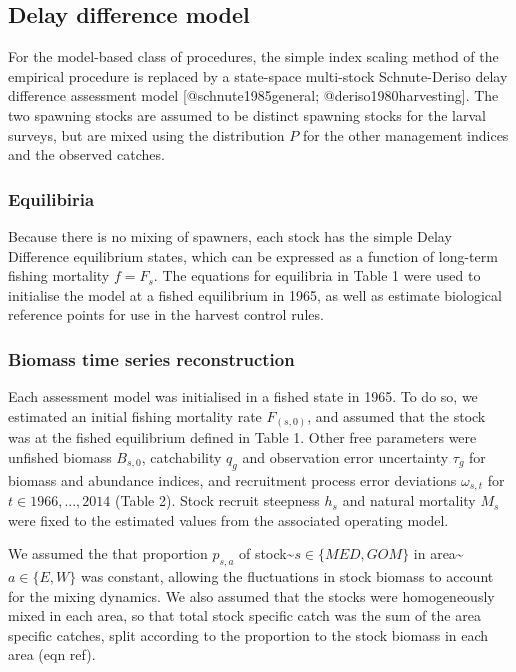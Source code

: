 \documentclass[]{article}
\begin{document}
\hypertarget{delay-difference-model}{%
\subsection{Delay difference model}\label{delay-difference-model}}

For the model-based class of procedures, the simple index scaling
method of the empirical procedure is replaced by a state-space
multi-stock Schnute-Deriso delay difference assessment model
{[}@schnute1985general; @deriso1980harvesting{]}. The two spawning
stocks are assumed to be distinct spawning stocks for the larval
surveys, but are mixed using the distribution \(P\) for
the other management indices and the observed catches.

\hypertarget{equilibiria}{%
\subsubsection{Equilibiria}\label{equilibiria}}

Because there is no mixing of spawners, each stock has the simple Delay
Difference equilibrium states, which can be expressed as a function
of long-term fishing mortality \(f = F_s\). The equations for equilibria
in Table 1 were used to initialise the model at a fished equilibrium
in 1965, as well as estimate biological reference points for use in
the harvest control rules.

\hypertarget{biomass-time-series-reconstruction}{%
\subsubsection{Biomass time series reconstruction}\label{biomass-time-series-reconstruction}}

Each assessment model was initialised in a fished state in 1965. To do so,
we estimated an initial fishing mortality rate \(F_(s,0)\), and assumed
that the stock was at the fished equilibrium defined in Table 1. Other free
parameters were unfished biomass \(B_{s,0}\), catchability \(q_g\) and
observation error uncertainty \(\tau_g\) for biomass and abundance indices,
and recruitment process error deviations \(\omega_{s,t}\) for
\(t \in 1966,..., 2014\) (Table 2). Stock recruit steepness \(h_s\)
and natural mortality \(M_s\) were fixed to the estimated values from
the associated operating model.

We assumed the that proportion \(p_{s,a}\) of
stock\textasciitilde{}\(s \in \{MED,GOM\}\) in area\textasciitilde{}\(a \in \{E,W\}\) was
constant, allowing the fluctuations in stock biomass to
account for the mixing dynamics. We also assumed that the stocks
were homogeneously mixed in each area, so that total stock specific
catch was the sum of the area specific catches, split according
to the proportion to the stock biomass in each area (eqn ref).
\end{document}
